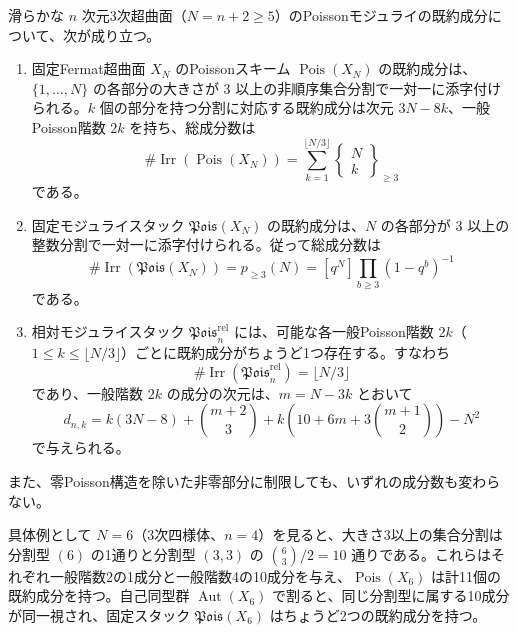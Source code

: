 \begin{theorem}\label{thm:pg-fermat-relative-count}
滑らかな $n$ 次元3次超曲面（$N=n+2\ge5$）のPoissonモジュライの既約成分について、次が成り立つ。
\begin{enumerate}
\item 固定Fermat超曲面 $X_N$ のPoissonスキーム $\operatorname{Pois}(X_N)$ の既約成分は、$\{1,\ldots,N\}$ の各部分の大きさが $3$ 以上の非順序集合分割で一対一に添字付けられる。$k$ 個の部分を持つ分割に対応する既約成分は次元 $3N-8k$、一般Poisson階数 $2k$ を持ち、総成分数は
\begin{equation}\label{eq:pg-fermat-count}
\#\operatorname{Irr}(\operatorname{Pois}(X_N))
=\sum_{k=1}^{\lfloor N/3\rfloor}
\left\{\begin{smallmatrix}N\\k\end{smallmatrix}\right\}_{\ge3}
\end{equation}
である。
\item 固定モジュライスタック $\mathfrak{Pois}(X_N)$ の既約成分は、$N$ の各部分が $3$ 以上の整数分割で一対一に添字付けられる。従って総成分数は
\begin{equation}\label{eq:pg-fermat-stack-count}
\#\operatorname{Irr}(\mathfrak{Pois}(X_N))
=p_{\ge3}(N)=[q^N]\prod_{b\ge3}(1-q^b)^{-1}
\end{equation}
である。
\item 相対モジュライスタック $\mathfrak{Pois}^{\mathrm{rel}}_n$ には、可能な各一般Poisson階数 $2k$（$1\le k\le\lfloor N/3\rfloor$）ごとに既約成分がちょうど1つ存在する。すなわち
\begin{equation}\label{eq:pg-relative-count}
\#\operatorname{Irr}(\mathfrak{Pois}^{\mathrm{rel}}_n)=\lfloor N/3\rfloor
\end{equation}
であり、一般階数 $2k$ の成分の次元は、$m=N-3k$ とおいて
\begin{equation}\label{eq:pg-relative-dim}
  d_{n,k}=k(3N-8)+\binom{m+2}{3}
  +k\left(10+6m+3\binom{m+1}{2}\right)-N^2
\end{equation}
で与えられる。
\end{enumerate}
また、零Poisson構造を除いた非零部分に制限しても、いずれの成分数も変わらない。
\end{theorem}

具体例として $N=6$（3次四様体、$n=4$）を見ると、大きさ3以上の集合分割は分割型 $(6)$ の1通りと分割型 $(3,3)$ の $\binom{6}{3}/2=10$ 通りである。これらはそれぞれ一般階数2の1成分と一般階数4の10成分を与え、$\operatorname{Pois}(X_6)$ は計11個の既約成分を持つ。自己同型群 $\operatorname{Aut}(X_6)$ で割ると、同じ分割型に属する10成分が同一視され、固定スタック $\mathfrak{Pois}(X_6)$ はちょうど2つの既約成分を持つ。

